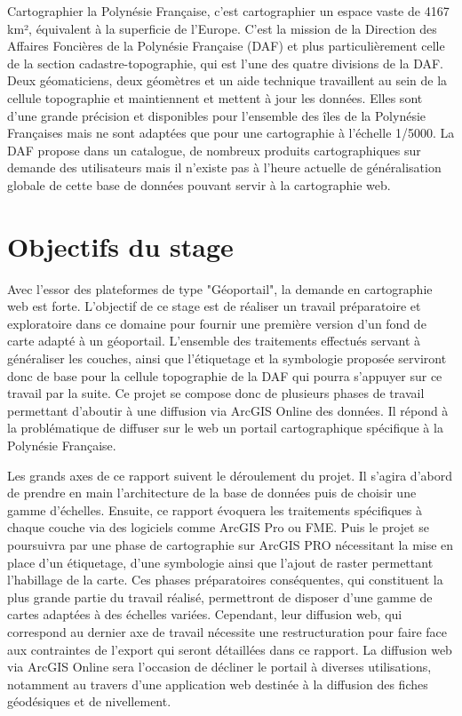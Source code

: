 \documentclass{themeensg}
\begin{document}
  \vspace{0.5cm}
	Cartographier la Polynésie Française, c'est cartographier un espace vaste de 4167 km², équivalent à la superficie de l’Europe. C'est la mission de la Direction des Affaires Foncières de la Polynésie Française (DAF) et plus particulièrement celle de la section cadastre-topographie, qui est l'une des quatre divisions de la DAF. Deux géomaticiens, deux géomètres et un aide technique travaillent au sein de la cellule topographie et maintiennent et mettent à jour les données. Elles sont d'une grande précision et disponibles pour l'ensemble des îles de la Polynésie Françaises mais ne sont adaptées que pour une cartographie à l'échelle 1/5000. La DAF propose dans un catalogue, de nombreux produits cartographiques sur demande des utilisateurs mais il n'existe pas à l'heure actuelle de généralisation globale de cette base de données pouvant servir à la cartographie web.

    \section*{Objectifs du stage}
	Avec l'essor des plateformes de type "Géoportail", la demande en cartographie web est forte. L'objectif de ce stage est de réaliser un travail préparatoire et exploratoire dans ce domaine pour fournir une première version d'un fond de carte adapté à un géoportail. L'ensemble des traitements effectués servant à généraliser les couches, ainsi que l'étiquetage et la symbologie proposée serviront donc de base pour la cellule topographie de la DAF qui pourra s'appuyer sur ce travail par la suite. Ce projet se compose donc de plusieurs phases de travail permettant d'aboutir à une diffusion via ArcGIS Online des données. Il répond à la problématique de diffuser sur le web un portail cartographique spécifique à la Polynésie Française.
	
	Les grands axes de ce rapport suivent le déroulement du projet. Il s'agira d'abord de prendre en main l'architecture de la base de données puis de choisir une gamme d'échelles. Ensuite, ce rapport évoquera les traitements spécifiques à chaque couche via des logiciels comme ArcGIS Pro ou FME. Puis le projet se poursuivra par une phase de cartographie sur ArcGIS PRO nécessitant la mise en place d'un étiquetage, d'une symbologie ainsi que l'ajout de raster permettant l'habillage de la carte. Ces phases préparatoires conséquentes, qui constituent la plus grande partie du travail réalisé, permettront de disposer d'une gamme de cartes adaptées à des échelles variées. Cependant, leur diffusion web, qui correspond au dernier axe de travail nécessite une restructuration pour faire face aux contraintes de l'export qui seront détaillées dans ce rapport. La diffusion web via ArcGIS Online sera l'occasion de décliner le portail à diverses utilisations, notamment au travers d'une application web destinée à la diffusion des fiches géodésiques et de nivellement. 
  
\end{document}

